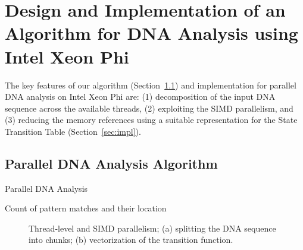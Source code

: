 \documentclass[conference]{IEEEtran}
\begin{document}
\section{Design and Implementation of an Algorithm for DNA Analysis using Intel Xeon Phi}
\label{our-algorithm}

The key features of our algorithm (Section~\ref{sec:alg1}) and implementation for parallel DNA analysis on Intel Xeon Phi are: (1) decomposition of the input DNA sequence across the available threads, (2) exploiting the SIMD parallelism, and (3) reducing the memory references using a suitable representation for the State Transition Table (Section~\ref{sec:impl}).

\subsection {Parallel DNA Analysis Algorithm}
\label{sec:alg1}


\begin{algorithm}[t]
	\caption{Parallel DNA Analysis}\label{alg:pac}
	\begin{algorithmic}[1]
		\Ensure Count of pattern matches and their location
		 \label{alg:pac:split}
		 \label{alg:pac:init_v}
\label{alg:pac:simd_loop} 
		  \label{alg:pac:load_next_node}
		 \label{alg:pac:check_final}
		\EndIf
		\EndFor
		\EndFor
		\EndFor
		\EndProcedure
	\end{algorithmic}
\end{algorithm}

\begin{figure}[ht]
	\label{fig:paradna}
	\centering
	\hfil
	\caption {Thread-level and SIMD parallelism; (a) splitting the DNA sequence into chunks; (b) vectorization of the transition function.}
	\label{fig_sim}
\end{figure}
\end{document}

